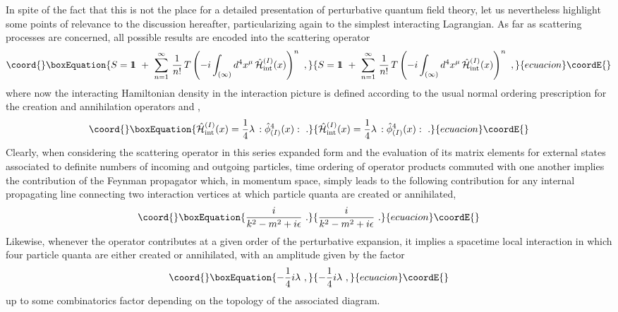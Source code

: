 \documentclass[a4paper,11pt]{article}
\def\one{1\hskip -.37em 1}
\begin{document}
In spite of the fact that this is not the place for a detailed presentation
of perturbative quantum field theory, let us nevertheless highlight some
points of relevance to the discussion hereafter, particularizing again to
the simplest \coordHE{} interacting Lagrangian.
As far as scattering processes are concerned, all possible results are
encoded into the scattering operator
\begin{equation}\coord{}\boxEquation{
S=\one\ +\ \sum_{n=1}^\infty\,\frac{1}{n!}\,
T\left(-i\int_{(\infty)}d^4x^\mu\,\hat{\cal H}^{(I)}_{\rm int}(x)\right)^n\ ,
}{
S=\one\ +\ \sum_{n=1}^\infty\,\frac{1}{n!}\,
T\left(-i\int_{(\infty)}d^4x^\mu\,\hat{\cal H}^{(I)}_{\rm int}(x)\right)^n\ ,
}{ecuacion}\coordE{}\end{equation}
where now the interacting Hamiltonian density in the interaction picture
is defined according to the usual normal ordering prescription for the
creation and annihilation operators \coordHE{} and \coordHE{},
\begin{equation}\coord{}\boxEquation{
\hat{\cal H}^{(I)}_{\rm int}(x)=\frac{1}{4}\lambda\,:\hat{\phi}^4_{(I)}(x):\ .
}{
\hat{\cal H}^{(I)}_{\rm int}(x)=\frac{1}{4}\lambda\,:\hat{\phi}^4_{(I)}(x):\ .
}{ecuacion}\coordE{}\end{equation}
Clearly, when considering the scattering operator in this series expanded
form and the evaluation of its matrix elements for external states associated
to de\-fi\-ni\-te numbers of incoming and outgoing particles, time ordering
of operator products commuted with one another implies the contribution
of the Feynman propagator which, in momentum space, simply leads to the
following contribution for any internal propagating line connecting two
interaction vertices at which particle quanta are created or annihilated,
\begin{equation}\coord{}\boxEquation{
\frac{i}{k^2-m^2+i\epsilon}\ .
}{
\frac{i}{k^2-m^2+i\epsilon}\ .
}{ecuacion}\coordE{}\end{equation}
Likewise, whenever the operator \coordHE{} contributes
at a given order of the perturbative expansion, it implies a spacetime
local interaction in which four particle quanta are either created or
annihilated, with an amplitude given by the factor
\begin{equation}\coord{}\boxEquation{
-\frac{1}{4}i\lambda\ ,
}{
-\frac{1}{4}i\lambda\ ,
}{ecuacion}\coordE{}\end{equation}
up to some combinatorics factor depending on the topology of the associated
diagram.
\end{document}
